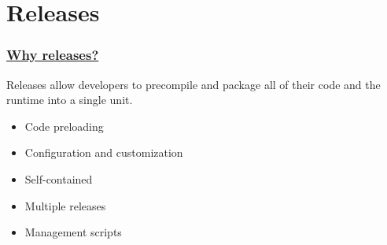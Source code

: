\section{Releases}

\frame{\tableofcontents[currentsection]}

\begin{frame}
    \frametitle{\href{https://hexdocs.pm/mix/Mix.Tasks.Release.html}{Why releases?}}  
    Releases allow developers to precompile and package all of their code and the runtime into a single unit.

    \begin{itemize}
        \item Code preloading
        \item Configuration and customization
        \item Self-contained
        \item Multiple releases
        \item Management scripts
    \end{itemize}
\end{frame}

